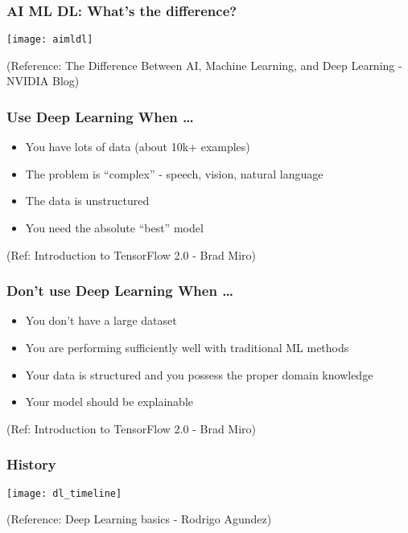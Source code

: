 \begin{frame}[fragile] \frametitle{AI ML DL: What's the difference?}
\begin{center}
\texttt{[image: aimldl]}
\end{center}

\tiny{(Reference: The Difference Between AI, Machine Learning, and Deep Learning - NVIDIA Blog)}
\end{frame}

\begin{frame}[fragile] \frametitle{Use Deep Learning When \ldots}

\begin{itemize}
\item You have lots of data (about 10k+ examples)
\item The problem is ``complex'' - speech, vision, natural language
\item The data is unstructured 
\item You need the absolute ``best'' model
\end{itemize}
\tiny{(Ref: Introduction to TensorFlow 2.0 - Brad Miro)}
\end{frame}

\begin{frame}[fragile] \frametitle{Don't use Deep Learning When \ldots}

\begin{itemize}
\item You don’t have a large dataset
\item You are performing sufficiently well with traditional ML methods
\item Your data is structured and you possess the proper domain knowledge
\item Your model should be explainable
\end{itemize}
\tiny{(Ref: Introduction to TensorFlow 2.0 - Brad Miro)}
\end{frame}

\begin{frame}[fragile] \frametitle{History}
\begin{center}
\texttt{[image: dl\_timeline]}
\end{center}

\tiny{(Reference: Deep Learning basics - Rodrigo Agundez)}
\end{frame}

